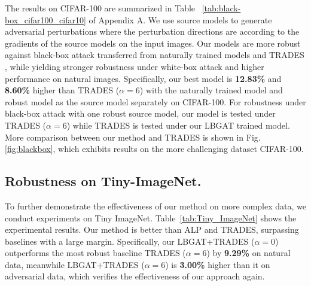 \documentclass[10pt,twocolumn,letterpaper]{article}
\begin{document}
The results on CIFAR-100 are summarized in Table ~\ref{tab:black-box_cifar100_cifar10} of Appendix A. We use source models to generate adversarial perturbations where the perturbation directions are according to the gradients of the source models on the input images. Our models are more robust against black-box attack transferred from naturally trained models and TRADES \cite{zhang2019theoretically}, while yielding stronger robustness under white-box attack and higher performance on natural images. Specifically, our best model is \textbf{12.83\%} and \textbf{8.60\%} higher than TRADES ($\alpha=6$) with the naturally trained model and robust model as the source model separately on CIFAR-100. For robustness under black-box attack with one robust source model, our model is tested under TRADES ($\alpha=6$) while TRADES is tested under our LBGAT trained model. More comparison between our method and TRADES is shown in Fig. \ref{fig:blackbox}, which exhibits results on the more challenging dataset CIFAR-100.

\subsection{Robustness on Tiny-ImageNet.}
To further demonstrate the effectiveness of our method on more complex data, we conduct experiments on Tiny ImageNet. Table~\ref{tab:Tiny_ImageNet} shows the experimental results. Our method is better than ALP and TRADES, surpassing baselines with a large margin. Specifically, our LBGAT+TRADES ($\alpha=0$) outperforms the most robust baseline TRADES ($\alpha=6$) by \textbf{9.29\%} on natural data, meanwhile LBGAT+TRADES ($\alpha=6$) is \textbf{3.00\%} higher than it on adversarial data, which verifies the effectiveness of our approach again.
\end{document}
